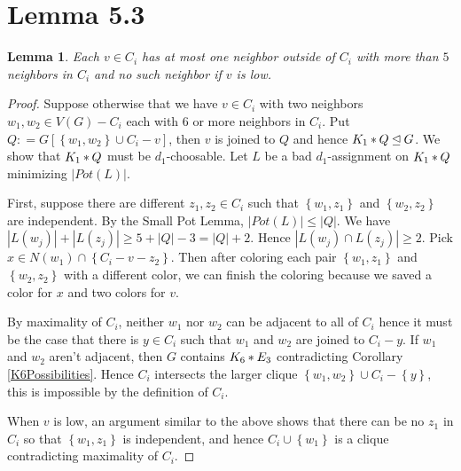 \documentclass[12pt]{amsart}
\theoremstyle{plain}
\newtheorem{lem}[thm]{Lemma}
\theoremstyle{definition}
\theoremstyle{plain}
\newcommand{\set}[1]{\left\{ #1 \right\}}
\newcommand{\card}[1]{\left|#1\right|}
\newcommand{\join}[2]{#1 \mbox{\hspace{2 pt}$\ast$\hspace{2 pt}} #2}
\newcommand{\DefinedAs}{\mathrel{\mathop:}=}
\begin{document}
\section{Lemma 5.3}
\begin{lem}\label{AtMostFourIn}
Each $v \in C_i$ has at most one
neighbor outside of $C_i$ with more than $5$ neighbors in $C_i$ and no such
neighbor if $v$ is low.
\end{lem}
\begin{proof}
Suppose otherwise that we have $v \in C_i$ with two neighbors $w_1, w_2 \in V(G)
- C_i$ each with $6$ or more neighbors in $C_i$.  Put $Q \DefinedAs
G[\set{w_1,w_2} \cup C_i - v]$, then $v$ is joined to $Q$ and hence
$\join{K_1}{Q} \unlhd G$.  We show that $\join{K_1}{Q}$ must be $d_1$-choosable.  Let $L$ be a bad $d_1$-assignment on $\join{K_1}{Q}$ minimizing $\card{Pot(L)}$.

First, suppose there are different $z_1,z_2 \in C_i$ such that $\set{w_1, z_1}$
and $\set{w_2, z_2}$ are independent.  By the Small Pot Lemma, $\card{Pot(L)} \leq \card{Q}$.  We have  $\card{L(w_j)} + \card{L(z_j)} \geq 5 + \card{Q} - 3 = \card{Q} + 2$.  Hence $\card{L(w_j) \cap L(z_j)}
\geq 2$.  Pick $x \in N(w_1) \cap \set{C_i - v - z_2}$.  Then after coloring each pair $\set{w_1, z_1}$ and $\set{w_2, z_2}$ with a different color, we can finish the coloring because we saved a color for $x$ and two colors for $v$.

By maximality of $C_i$, neither $w_1$ nor $w_2$ can be adjacent to all of $C_i$
hence it must be the case that there is $y \in C_i$ such that $w_1$ and $w_2$
are joined to $C_i - y$.  If $w_1$ and $w_2$ aren't adjacent, then $G$ contains $\join{K_6}{E_3}$ contradicting Corollary \ref{K6Possibilities}.  Hence $C_i$ intersects the larger clique $\set{w_1, w_2} \cup C_i - \set{y}$, this is impossible by the definition of $C_i$.

When $v$ is low, an argument similar to the above shows that there can be no
$z_1$ in $C_i$ so that $\set{w_1, z_1}$ is independent, and hence $C_i \cup
\set{w_1}$ is a clique contradicting maximality of $C_i$.
\end{proof}



\end{document}
